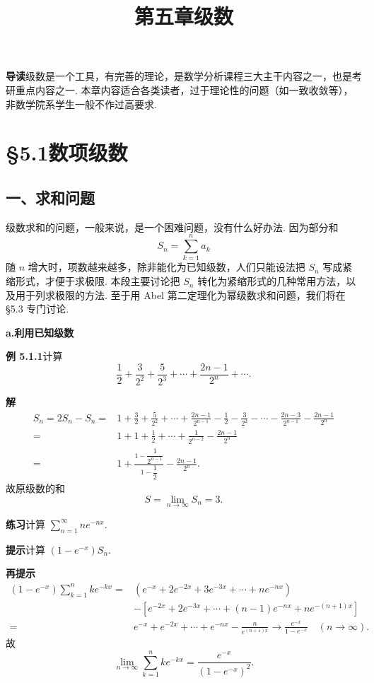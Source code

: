 \documentclass[UTF8, 12pt, fontset=fandol, oneside]{ctexart}
\title{第五章\quad 级数}
\author{}
\date{}
\begin{document}
\maketitle

\noindent\textbf{导读}\quad 级数是一个工具，有完善的理论，是数学分析课程三大主干内容之一，也是考研重点内容之一. 本章内容适合各类读者，过于理论性的问题（如一致收敛等），非数学院系学生一般不作过高要求.

\section*{§5.1\quad 数项级数}

\subsection*{一、求和问题}

级数求和的问题，一般来说，是一个困难问题，没有什么好办法. 因为部分和
\[
  S_n=\sum_{k=1}^n a_k
\]
随 $n$ 增大时，项数越来越多，除非能化为已知级数，人们只能设法把 $S_n$ 写成紧缩形式，才便于求极限. 本段主要讨论把 $S_n$ 转化为紧缩形式的几种常用方法，以及用于列求极限的方法. 至于用 Abel 第二定理化为幂级数求和问题，我们将在 §5.3 专门讨论.

\noindent\textbf{a.\quad 利用已知级数}

\noindent\textbf{例 5.1.1}\quad 计算
\[
  \frac12+\frac3{2^2}+\frac5{2^3}+\cdots+\frac{2n-1}{2^n}+\cdots.
\]

\noindent\textbf{解}\quad
\[
\begin{aligned}
S_n=2S_n-S_n
={}&1+\frac32+\frac5{2^2}+\cdots+\frac{2n-1}{2^{n-1}}
      -\frac12-\frac3{2^2}-\cdots-\frac{2n-3}{2^{n-1}}-\frac{2n-1}{2^n}\\
={}&1+1+\frac12+\cdots+\frac1{2^{n-2}}-\frac{2n-1}{2^n}\\
={}&1+\frac{1-\dfrac1{2^{n-1}}}{1-\dfrac12}-\frac{2n-1}{2^n}.
\end{aligned}
\]
故原级数的和
\[
  S=\lim_{n\to\infty}S_n=3.
\]

\noindent\textbf{练习}\quad 计算 $\displaystyle\sum_{n=1}^\infty ne^{-nx}$.

\noindent\textbf{提示}\quad 计算 $(1-e^{-x})S_n$.

\noindent\textbf{再提示}\quad
\[
\begin{aligned}
(1-e^{-x})\sum_{k=1}^n ke^{-kx}
={}&(e^{-x}+2e^{-2x}+3e^{-3x}+\cdots+ne^{-nx})\\
&-\left[e^{-2x}+2e^{-3x}+\cdots+(n-1)e^{-nx}+ne^{-(n+1)x}\right]\\
={}&e^{-x}+e^{-2x}+\cdots+e^{-nx}-\frac{n}{e^{(n+1)x}}
\to \frac{e^{-x}}{1-e^{-x}}\quad(n\to\infty).
\end{aligned}
\]
故
\[
  \lim_{n\to\infty}\sum_{k=1}^n ke^{-kx}
  =\frac{e^{-x}}{(1-e^{-x})^2}.
\]
\end{document}
